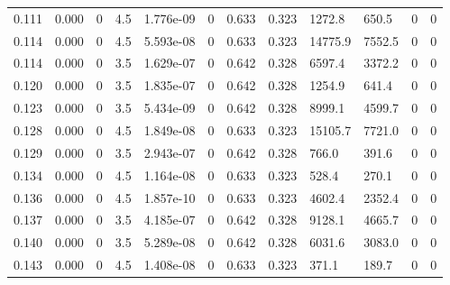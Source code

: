 \documentclass[preview]{standalone}
\begin{document}
{{\begin{tabular}{L{1.2cm}C{1.2cm} C{0.3cm}C{0.5cm} C{1.4cm}C{1.4cm} C{1.4cm}C{1.4cm} C{1.6cm}C{1.6cm} C{1.6cm}C{1.6cm}}
  0.111  &  0.000  & 0     & 4.5 &  1.776e-09  & 0  &  0.633&   0.323& 1272.8 & 650.5   &  0 & 0  \\ 
  0.114  &  0.000  & 0     & 4.5 &  5.593e-08  & 0  &  0.633&   0.323& 14775.9 & 7552.5   &  0 & 0  \\ 
  0.114  &  0.000  & 0     & 3.5 &  1.629e-07  & 0  &  0.642&   0.328& 6597.4 & 3372.2   &  0 & 0  \\ 
  0.120  &  0.000  & 0     & 3.5 &  1.835e-07  & 0  &  0.642&   0.328& 1254.9 & 641.4   &  0 & 0  \\ 
  0.123  &  0.000  & 0     & 3.5 &  5.434e-09  & 0  &  0.642&   0.328& 8999.1 & 4599.7   &  0 & 0  \\ 
  0.128  &  0.000  & 0     & 4.5 &  1.849e-08  & 0  &  0.633&   0.323& 15105.7 & 7721.0   &  0 & 0  \\ 
  0.129  &  0.000  & 0     & 3.5 &  2.943e-07  & 0  &  0.642&   0.328& 766.0 & 391.6   &  0 & 0  \\ 
  0.134  &  0.000  & 0     & 4.5 &  1.164e-08  & 0  &  0.633&   0.323& 528.4 & 270.1   &  0 & 0  \\ 
  0.136  &  0.000  & 0     & 4.5 &  1.857e-10  & 0  &  0.633&   0.323& 4602.4 & 2352.4   &  0 & 0  \\ 
  0.137  &  0.000  & 0     & 3.5 &  4.185e-07  & 0  &  0.642&   0.328& 9128.1 & 4665.7   &  0 & 0  \\ 
  0.140  &  0.000  & 0     & 3.5 &  5.289e-08  & 0  &  0.642&   0.328& 6031.6 & 3083.0   &  0 & 0  \\ 
  0.143  &  0.000  & 0     & 4.5 &  1.408e-08  & 0  &  0.633&   0.323& 371.1 & 189.7   &  0 & 0  \\ 
\hline 
\end{tabular} 

}}
\end{document}

